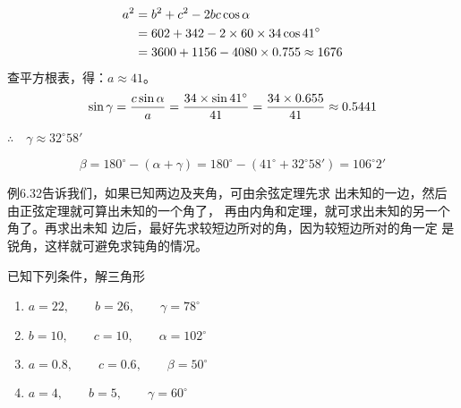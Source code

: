 \begin{solution}
\[\begin{split}
    a^2&=b^2+c^2-2bc\cos\alpha\\
&=602+342-2\times60\times34\cos41^{\circ}\\
&=3600+1156-4080\times0.755\approx 1676
\end{split}\]
查平方根表，得：$a\approx 41$。
\[\sin\gamma=\dfrac{c\sin\alpha}{a}=\dfrac{34\times\sin41^{\circ}}{41}=\dfrac{34\times 0.655}{41}\approx 0.5441\]

$\therefore\quad \gamma\approx 32^{\circ}58'$

\[\beta=180^{\circ}-(\alpha+\gamma)
=180^{\circ}-(41^{\circ}+32^{\circ}58')
=106^{\circ}2'\]    
\end{solution}


例6.32告诉我们，如果已知两边及夹角，可由余弦定理先求
出未知的一边，然后由正弦定理就可算出未知的一个角了，
再由内角和定理，就可求出未知的另一个角了。再求出未知
边后，最好先求较短边所对的角，因为较短边所对的角一定
是锐角，这样就可避免求钝角的情况。

\begin{ex}
    已知下列条件，解三角形
\begin{enumerate}
\item  $a=22,\qquad b=26,\qquad \gamma=78^{\circ}$
\item  $b=10,\qquad c=10,\qquad \alpha=102^{\circ}$
\item  $a=0.8,\qquad c=0.6,\qquad \beta=50^{\circ}$
\item  $a=4,\qquad b=5,\qquad \gamma=60^{\circ}$
\end{enumerate}
\end{ex}







\begin{example}
    
\end{example}


\begin{solution}
    
\end{solution}











































